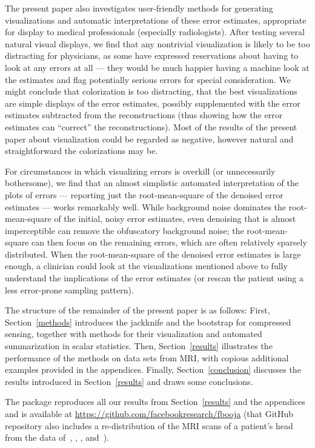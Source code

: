 \documentclass[article]{jdssv}
\begin{document}
The present paper also investigates user-friendly methods
for generating visualizations and automatic interpretations
of these error estimates,
appropriate for display to medical professionals (especially radiologists).
After testing several natural visual displays,
we find that any nontrivial visualization is likely to be too distracting
for physicians, as some have expressed reservations about having to look
at any errors at all --- they would be much happier having a machine look
at the estimates and flag potentially serious errors for special consideration.
We might conclude that colorization is too distracting,
that the best visualizations are simple displays of the error estimates,
possibly supplemented with the error estimates
subtracted from the reconstructions (thus showing how the error estimates
can ``correct'' the reconstructions).
Most of the results of the present paper about visualization could be regarded
as negative, however natural and straightforward the colorizations may be.

For circumstances in which visualizing errors is overkill
(or unnecessarily bothersome),
we find that an almost simplistic automated interpretation
of the plots of errors --- reporting just the root-mean-square
of the denoised error estimates --- works remarkably well.
While background noise dominates the root-mean-square
of the initial, noisy error estimates,
even denoising that is almost imperceptible
can remove the obfuscatory background noise;
the root-mean-square can then focus on the remaining errors,
which are often relatively sparsely distributed.
When the root-mean-square of the denoised error estimates is large enough,
a clinician could look at the visualizations mentioned above
to fully understand the implications of the error estimates
(or rescan the patient using a less error-prone sampling pattern).

The structure of the remainder of the present paper is as follows:
First, Section~\ref{methods} introduces the jackknife and the bootstrap
for compressed sensing, together with methods for their visualization
and automated summarization in scalar statistics.
Then, Section~\ref{results} illustrates the performance of the methods
on data sets from MRI, with copious additional examples provided
in the appendices.
Finally, Section~\ref{conclusion} discusses the results introduced
in Section~\ref{results} and draws some conclusions.

The  package  reproduces all our results
from Section~\ref{results} and the appendices and is available at
\url{https://github.com/facebookresearch/fbooja}
(that GitHub repository also includes a re-distribution
of the MRI scans of a patient's head from the data
of~\citet{mri2}, \citet{mri1}, \citet{mri3}, and~\citet{mri4}).
\end{document}
